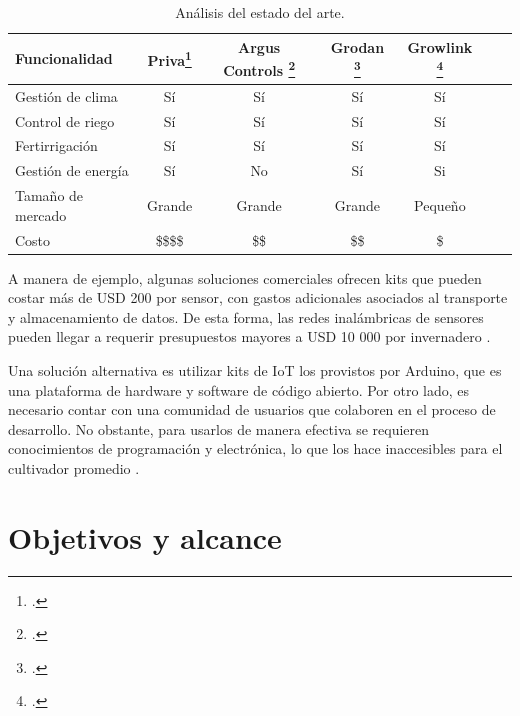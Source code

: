 \begin{table}[h]
\centering
\caption[Análisis del estado del arte]{Análisis del estado del arte.}

\begin{tabular}{lcccccc} 
\toprule
\textbf{Funcionalidad} & \textbf{Priva\footcite{priva}}  & \textbf{Argus Controls \footcite{arguscontrol}} &\textbf{Grodan \footcite{grodan}} & \textbf{Growlink \footcite{growlink}}\\

\midrule
Gestión de clima   & Sí & Sí & Sí & Sí \\
Control de riego   & Sí & Sí & Sí & Sí \\
Fertirrigación     & Sí & Sí & Sí & Sí \\
Gestión de energía & Sí & No & Sí & Si \\
Tamaño de mercado  & Grande &  Grande & Grande & Pequeño \\
Costo              & \$\$\$\$ &  \$\$ & \$\$ &  \$ \\
\bottomrule
\hline
\end{tabular}
\label{tab:vendors}
\end{table}

A manera de ejemplo, algunas soluciones comerciales ofrecen kits que pueden costar más de USD 200 por sensor, con gastos adicionales asociados al transporte y almacenamiento de datos. De esta forma, las redes inalámbricas de sensores pueden llegar a requerir presupuestos mayores a USD 10 000 por invernadero \citep{digger:1}.

Una solución alternativa es utilizar kits de IoT los provistos por Arduino\citep{arduino}, que es una plataforma de hardware y software de código abierto. Por otro lado, es necesario contar con una comunidad de usuarios que colaboren en el proceso de desarrollo. No obstante, para usarlos de manera efectiva se requieren conocimientos de programación y electrónica, lo que los hace inaccesibles para el cultivador promedio \citep{digger:1}. \\



\section{Objetivos y alcance}


